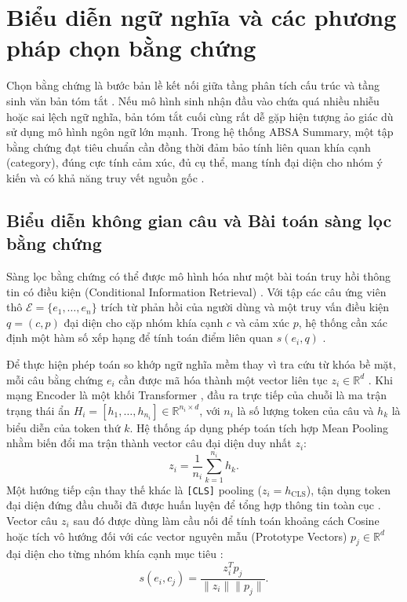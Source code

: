 \section{Biểu diễn ngữ nghĩa và các phương pháp chọn bằng chứng}
\label{sec:dev-chap2-evidence-selection}

Chọn bằng chứng là bước bản lề kết nối giữa tầng phân tích cấu trúc và tầng sinh văn bản tóm tắt \cite{angelidis2021extractive}. Nếu mô hình sinh nhận đầu vào chứa quá nhiều nhiễu hoặc sai lệch ngữ nghĩa, bản tóm tắt cuối cùng rất dễ gặp hiện tượng ảo giác dù sử dụng mô hình ngôn ngữ lớn mạnh. Trong hệ thống ABSA Summary, một tập bằng chứng đạt tiêu chuẩn cần đồng thời đảm bảo tính liên quan khía cạnh (category), đúng cực tính cảm xúc, đủ cụ thể, mang tính đại diện cho nhóm ý kiến và có khả năng truy vết nguồn gốc \cite{angelidis2021extractive}.

\subsection{Biểu diễn không gian câu và Bài toán sàng lọc bằng chứng}
\label{subsec:dev-chap2-sentence-embedding-ir}

Sàng lọc bằng chứng có thể được mô hình hóa như một bài toán truy hồi thông tin có điều kiện (Conditional Information Retrieval) \cite{angelidis2021extractive}. Với tập các câu ứng viên thô $\mathcal{E}=\{e_1,\ldots,e_n\}$ trích từ phản hồi của người dùng và một truy vấn điều kiện $q=(c,p)$ đại diện cho cặp nhóm khía cạnh $c$ và cảm xúc $p$, hệ thống cần xác định một hàm số xếp hạng để tính toán điểm liên quan $s(e_i,q)$ \cite{angelidis2021extractive}.

Để thực hiện phép toán so khớp ngữ nghĩa mềm thay vì tra cứu từ khóa bề mặt, mỗi câu bằng chứng $e_i$ cần được mã hóa thành một vector liên tục $z_i \in \mathbb{R}^{d}$ \cite{angelidis2021extractive}. Khi mạng Encoder là một khối Transformer \cite{vaswani2017attention}, đầu ra trực tiếp của chuỗi là ma trận trạng thái ẩn $H_i=[h_1,\ldots,h_{n_i}]\in\mathbb{R}^{n_i\times d}$, với $n_i$ là số lượng token của câu và $h_k$ là biểu diễn của token thứ $k$. Hệ thống áp dụng phép toán tích hợp Mean Pooling nhằm biến đổi ma trận thành vector câu đại diện duy nhất $z_i$:
\begin{equation}
z_i=\frac{1}{n_i}\sum_{k=1}^{n_i}h_k.
\label{eq:dev-chap2-mean-pooling}
\end{equation}
Một hướng tiếp cận thay thế khác là \texttt{[CLS]} pooling ($z_i=h_{\mathrm{CLS}}$), tận dụng token đại diện đứng đầu chuỗi đã được huấn luyện để tổng hợp thông tin toàn cục \cite{devlin2019bert}. Vector câu $z_i$ sau đó được dùng làm cầu nối để tính toán khoảng cách Cosine hoặc tích vô hướng đối với các vector nguyên mẫu (Prototype Vectors) $p_j \in \mathbb{R}^{d}$ đại diện cho từng nhóm khía cạnh mục tiêu \cite{angelidis2021extractive}:
\begin{equation}
s(e_i,c_j)=\frac{z_i^T p_j}{\|z_i\|\|p_j\|}.
\label{eq:dev-chap2-cosine-evidence}
\end{equation}

